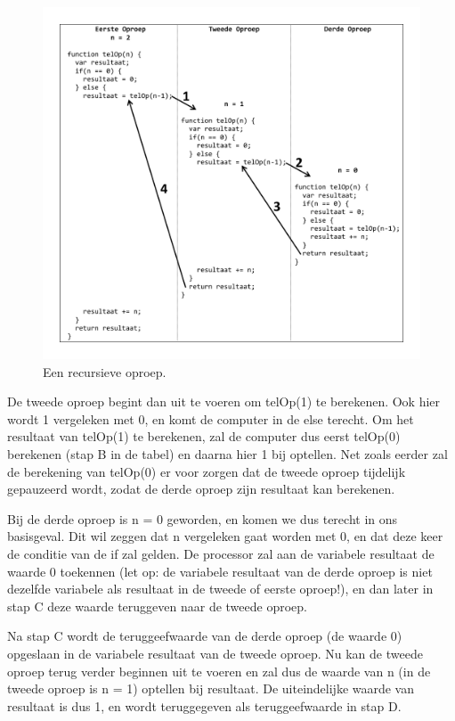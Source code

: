 \begin{figure}
\centering
\includegraphics[scale=0.8]{Recursie/vb.pdf}
\caption{Een recursieve oproep.}\label{fig:vbrecursief}
\end{figure}

De tweede oproep begint dan uit te voeren om telOp(1) te berekenen. Ook hier wordt 1 vergeleken met 0, en komt de computer in de else terecht. Om het resultaat van telOp(1) te berekenen, zal de computer dus eerst telOp(0) berekenen (stap B in de tabel) en daarna hier 1 bij optellen. Net zoals eerder zal de berekening van telOp(0) er voor zorgen dat de tweede oproep tijdelijk gepauzeerd wordt, zodat de derde oproep zijn resultaat kan berekenen.

Bij de derde oproep is n = 0 geworden, en komen we dus terecht in ons basisgeval. Dit wil zeggen dat n vergeleken gaat worden met 0, en dat deze keer de conditie van de if zal gelden. De processor zal aan de variabele resultaat de waarde 0 toekennen (let op: de variabele resultaat van de derde oproep is niet dezelfde variabele als resultaat in de tweede of eerste oproep!), en dan later in stap C deze waarde teruggeven naar de tweede oproep.

Na stap C wordt de teruggeefwaarde van de derde oproep (de waarde 0) opgeslaan in de variabele resultaat van de tweede oproep. Nu kan de tweede oproep terug verder beginnen uit te voeren en zal dus de waarde van n (in de tweede oproep is n = 1) optellen bij resultaat. De uiteindelijke waarde van resultaat is dus 1, en wordt teruggegeven als teruggeefwaarde in stap D.


